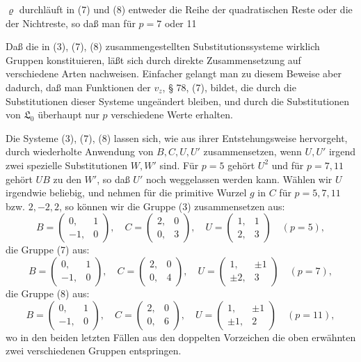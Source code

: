 
$\varrho$ durchläuft in (7) und (8) entweder die Reihe der quadratischen Reste oder die der Nichtreste, so daß man für $p = 7$ oder 11 

Daß die in (3), (7), (8) zusammengestellten Substitutionssysteme wirklich Gruppen konstituieren, läßt sich durch direkte Zusammensetzung auf verschiedene Arten nachweisen. Einfacher gelangt man zu diesem Beweise aber dadurch, daß man Funktionen der $v_z$, § 78, (7), bildet, die durch die Substitutionen dieser Systeme ungeändert bleiben, und durch die Substitutionen von $\mathfrak{L}_0$ überhaupt nur $p$ verschiedene Werte erhalten.

Die Systeme (3), (7), (8) lassen sich, wie aus ihrer Entstehungsweise hervorgeht, durch wiederholte Anwendung von $B, C, U, U'$ zusammensetzen, wenn $U, U'$ irgend zwei spezielle Substitutionen $W, W'$ sind. Für $p = 5$ gehört $U^2$ und für $p = 7, 11$ gehört $UB$ zu den $W'$, so daß $U'$ noch weggelassen werden kann. Wählen wir $U$ irgendwie beliebig, und nehmen für die primitive Wurzel $g$ in $C$ für $p = 5, 7, 11$ bzw. $2, -2, 2$, so können wir die Gruppe (3) zusammensetzen aus:
\[
B = \begin{pmatrix} 0, & 1 \\ -1, & 0 \end{pmatrix}, \quad C = \begin{pmatrix} 2, & 0 \\ 0, & 3 \end{pmatrix}, \quad U = \begin{pmatrix} 1, & 1 \\ 2, & 3 \end{pmatrix} \quad (p = 5),
\]
die Gruppe (7) aus:
\[
B = \begin{pmatrix} 0, & 1 \\ -1, & 0 \end{pmatrix}, \quad C = \begin{pmatrix} 2, & 0 \\ 0, & 4 \end{pmatrix}, \quad U = \begin{pmatrix} 1, & \pm 1 \\ \pm 2, & 3 \end{pmatrix} \quad (p = 7),
\]
die Gruppe (8) aus:
\[
B = \begin{pmatrix} 0, & 1 \\ -1, & 0 \end{pmatrix}, \quad C = \begin{pmatrix} 2, & 0 \\ 0, & 6 \end{pmatrix}, \quad U = \begin{pmatrix} 1, & \pm 1 \\ \pm 1, & 2 \end{pmatrix} \quad (p = 11),
\]
wo in den beiden letzten Fällen aus den doppelten Vorzeichen die oben erwähnten zwei verschiedenen Gruppen entspringen.

